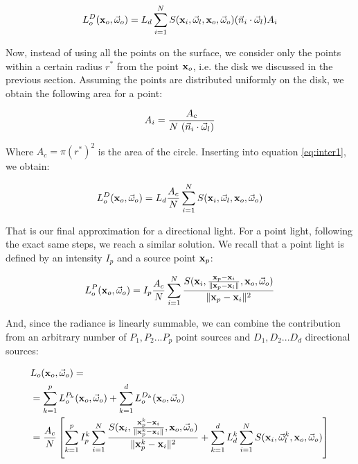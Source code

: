 \begin{equation}
L_o^D(\mathbf{x}_o,\vec{\omega}_o) = L_d \sum_{i = 1}^N S(\mathbf{x}_i, \vec{\omega}_l, \mathbf{x}_o, \vec{\omega}_o) (\vec{n}_i \cdot \vec{\omega}_l) A_i 
\label{eq:inter1}
\end{equation}

Now, instead of using all the points on the surface, we consider only the points within a certain radius $r^*$ from the point $\mathbf{x}_o$, i.e. the disk we discussed in the previous section. Assuming the points are distributed uniformly on the disk, we obtain the following area for a point:

$$
A_i = \frac{A_c}{N \ (\vec{n}_i \cdot \vec{\omega}_l)}
$$

Where $A_c = \pi (r^*)^2$ is the area of the circle. Inserting into equation \ref{eq:inter1}, we obtain:

\begin{equation}
L_o^D(\mathbf{x}_o,\vec{\omega}_o) = L_d \frac{A_c}{N} \sum_{i = 1}^N S(\mathbf{x}_i, \vec{\omega}_l, \mathbf{x}_o, \vec{\omega}_o)
\label{eq:inter2}
\end{equation}

That is our final approximation for a directional light. For a point light, following the exact same steps, we reach a similar solution. We recall that a point light is defined by an intensity $I_p$ and a source point $\mathbf{x}_p$:

\begin{equation}
L_o^P(\mathbf{x}_o,\vec{\omega}_o) = I_p \frac{A_c}{N} \sum_{i = 1}^N \frac{S(\mathbf{x}_i, \frac{\mathbf{x}_p - \mathbf{x}_i}{\|\mathbf{x}_p - \mathbf{x}_i\|}, \mathbf{x}_o, \vec{\omega}_o)}{\|\mathbf{x}_p - \mathbf{x}_i\|^2}
\label{eq:inter3}
\end{equation}

And, since the radiance is linearly summable, we can combine the contribution from an arbitrary number of $P_1, P_2 ... P_p$ point sources and $D_1, D_2 ... D_d$ directional sources:

\begin{equation}
\begin{split}
&L_o(\mathbf{x}_o,\vec{\omega}_o) = \\
&= \sum_{k=1}^{p}L_o^{P_k}(\mathbf{x}_o,\vec{\omega}_o) + \sum_{k=1}^{d}L_o^{D_k}(\mathbf{x}_o,\vec{\omega}_o) \\
&= \frac{A_c}{N} \left[ \sum_{k=1}^{p}I_p^k \sum_{i = 1}^N \frac{S(\mathbf{x}_i, \frac{\mathbf{x}_p^k - \mathbf{x}_i}{\|\mathbf{x}_p^k - \mathbf{x}_i\|}, \mathbf{x}_o, \vec{\omega}_o)}{\|\mathbf{x}_p^k - \mathbf{x}_i\|^2} + \sum_{k=1}^{d} L_d^k \sum_{i = 1}^N S(\mathbf{x}_i, \vec{\omega}^k_l, \mathbf{x}_o, \vec{\omega}_o) \right] 
\end{split}
\end{equation}


